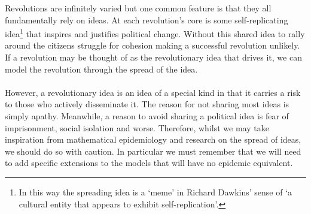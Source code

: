 Revolutions are infinitely varied but one common feature is that they all fundamentally rely on ideas. At each revolution's core is some self-replicating idea\footnote{In this way the spreading idea is a `meme' in Richard Dawkins' sense of `a cultural entity that appears to exhibit self-replication'\cite{selfish-gene}.} that inspires and justifies political change. Without this shared idea to rally around the citizens struggle for cohesion making a successful revolution unlikely\cite{tyranny}\cite{logic-non-violence}. If a revolution may be thought of as the revolutionary idea that drives it, we can model the revolution through the spread of the idea.
\\
\\
However, a revolutionary idea is an idea of a special kind in that it carries a risk to those who actively disseminate it. The reason for not sharing most ideas is simply apathy. Meanwhile, a reason to avoid sharing a political idea is fear of imprisonment, social isolation and worse.
Therefore, whilst we may take inspiration from mathematical epidemiology and research on the spread of ideas, we should do so with caution. In particular we must remember that we will need to add specific extensions to the models that will have no epidemic equivalent.


